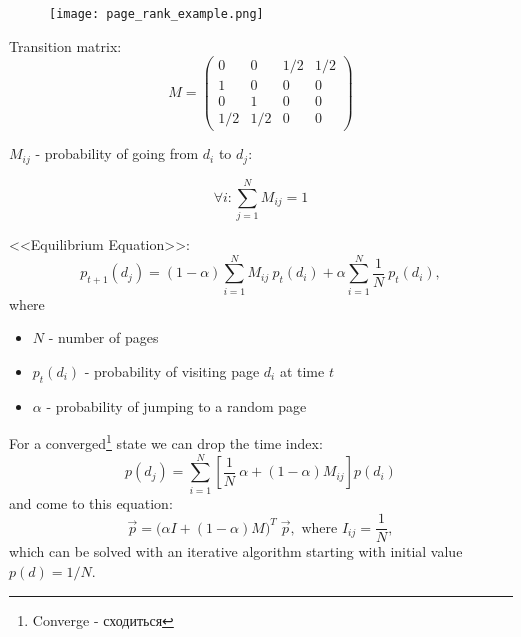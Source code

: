 \begin{multicols}{2}
\begin{figure}[H]
    \centering
    \texttt{[image: page\_rank\_example.png]}
\end{figure}


Transition matrix:
\begin{equation*}
M = 
\begin{pmatrix}
 0  &  0  & 1/2 & 1/2 \\
 1  &  0  &  0  &  0 \\
 0  &  1  &  0  &  0 \\
1/2 & 1/2 &  0  &  0 
\end{pmatrix}
\end{equation*}

$M_{ij}$ - probability of going from $d_i$ to $d_j$:

\begin{equation*}
\forall i: \sum_{j=1}^{N} M_{ij} = 1
\end{equation*}
\end{multicols}

\vspace{5mm}
<<Equilibrium Equation>>:
\begin{equation*}
p_{t+1}(d_j) = (1-\alpha) \sum_{i=1}^{N}M_{ij}\:p_t(d_i) + \alpha \sum_{i=1}^{N}\frac{1}{N}\:p_t(d_i),
\end{equation*}
where 
\begin{itemize}
\item $N$ - number of pages
\item $p_t(d_i)$ - probability of visiting page $d_i$ at time $t$
\item $\alpha$ - probability of jumping to a random page
\end{itemize}

\vspace{5mm}
For a converged\footnote{Converge - сходиться} state we can drop the time index:
\begin{equation*}
p(d_j) = \sum_{i=1}^{N} \left[ \frac{1}{N} \: \alpha + (1-\alpha) M_{ij} \right ] p(d_i) 
\end{equation*}
and come to this equation:
\begin{equation*}
\vec{p} = \Big(\alpha I + (1-\alpha) M \Big)^T \; \vec{p}, \text{ where } I_{ij} = \frac{1}{N},
\end{equation*}
which can be solved with an iterative algorithm starting with initial value $p(d)=1/N$.  

